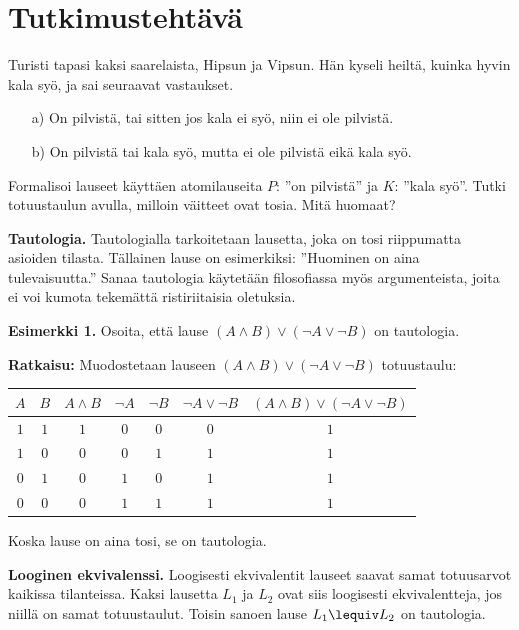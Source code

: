 \section*{Tutkimustehtävä}
Turisti tapasi kaksi saarelaista, Hipsun ja Vipsun. Hän kyseli heiltä, kuinka hyvin kala syö, ja sai seuraavat vastaukset.
\begin{enumerate}
\item[a)] On pilvistä, tai sitten jos kala ei syö, niin ei ole pilvistä.
\item[b)] On pilvistä tai kala syö, mutta ei ole pilvistä eikä kala syö.
\end{enumerate}
Formalisoi lauseet käyttäen atomilauseita $P$: ''on pilvistä'' ja $K$: ''kala syö''. Tutki totuustaulun avulla, milloin väitteet ovat tosia. Mitä huomaat?

{\bf Tautologia.}
Tautologialla tarkoitetaan lausetta, joka on tosi riippumatta asioiden tilasta. Tällainen lause on esimerkiksi: ''Huominen on aina tulevaisuutta.'' Sanaa tautologia käytetään filosofiassa myös argumenteista, joita ei voi kumota tekemättä ristiriitaisia oletuksia.

{\bf Esimerkki 1.} Osoita, että lause $(A\land B)\lor (\lnot A \lor \lnot B)$ on
tautologia.

{\bf Ratkaisu:}
Muodostetaan lauseen $(A\land B)\lor (\lnot A \lor \lnot
B)$ totuustaulu:

\begin{center}
\begin{tabular}{|c|c|c|c|c|c|c|}\hline
$A$ & $B$ & $A\land B$ & $\lnot A$ & $\lnot B$ & $ \lnot
A \lor \lnot B $ & $(A\land B)\lor (\lnot A \lor \lnot B)$
\\ \hline
$1$ & $1$ & $1$ & $0$ & $0$ & $0$ & $1$ \\ %
$1$ & $0$ & $0$ & $0$ & $1$ & $1$ & $1$ \\
$0$ & $1$ & $0$ & $1$ & $0$ & $1$ & $1$ \\
$0$ & $0$ & $0$ & $1$ & $1$ & $1$ & $1$ \\ \hline
\end{tabular}
\end{center}

Koska lause on aina tosi, se on tautologia.

{\bf Looginen ekvivalenssi.}  Loogisesti
ekvivalentit lauseet saavat samat totuusarvot
kaikissa tilanteissa. Kaksi lausetta $L_1$ ja
$L_2$ ovat siis  loogisesti ekvivalentteja, jos niillä
on samat totuustaulut. Toisin sanoen lause $L_1 \lequiv L_2$ on tautologia.

